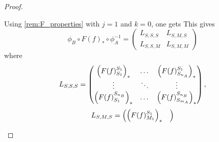 \begin{proof}
\begin{enumerate}
{            Using \autoref{rem:F_properties} with \( j = 1 \) and \( k = 0 \), one gets
            This gives
            \[
                \phi_B \circ F(f)_* \circ \phi_A^{-1} =
                \begin{pmatrix}
                    L_{S, S, S} & L_{S, M, S} \\
                    L_{S, S, M} & L_{S, M, M}
                \end{pmatrix}
            \]
            where
            \[
                L_{S, S, S} =
                \begin{pmatrix}
                    \left(  F(f)_{S_1}^{S_1}  \right)_* &
                    \dots &
                    \left(  F(f)_{S_{n_A}}^{S_1}  \right)_* \\
                    \vdots & \ddots & \vdots \\
                    \left(  F(f)_{S_1}^{S_{n_B}}  \right)_* &
                    \dots &
                    \left(  F(f)_{S_{m_A}}^{S_{n_B}}  \right)_* \\
                \end{pmatrix},
            \]
            \[
                L_{S, M, S} =
                \begin{pmatrix}
                    \left(  F(f)_{M_1}^{S_1}  \right)_* &

\end{pmatrix}\]}
\end{enumerate}
\end{proof}
